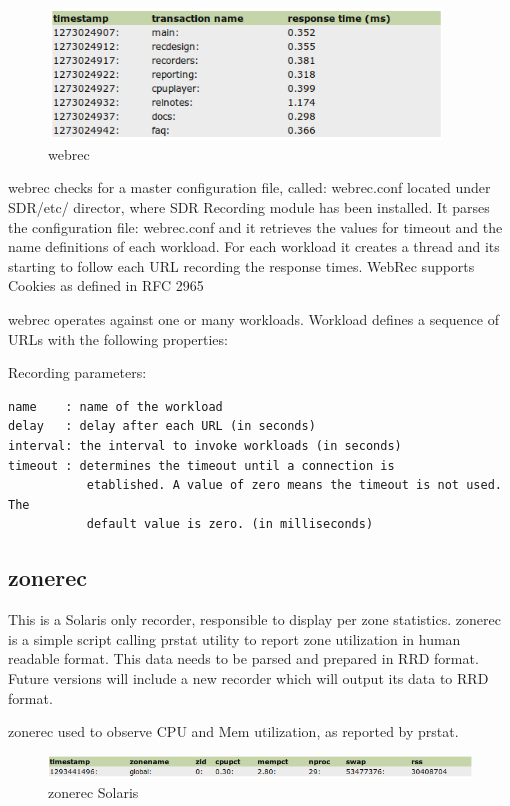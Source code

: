 \begin{figure}[!ht]
\centering
\includegraphics[width=105mm,height=35mm]{webrec.png}
\caption{webrec}
\label{fig:webrec}
\end{figure}

webrec checks for a master configuration file, called: webrec.conf located
under SDR/etc/ director, where SDR Recording module has been installed. It
parses the configuration file: webrec.conf and it retrieves the values for
timeout and the name definitions of each workload. For each workload it
creates a thread and its starting to follow each URL recording the response
times. WebRec supports Cookies as defined in RFC 2965 

webrec operates against one or many workloads. Workload defines a sequence of
URLs with the following properties:

\noindent
Recording parameters:

\begin{verbatim}
name    : name of the workload
delay   : delay after each URL (in seconds)
interval: the interval to invoke workloads (in seconds)
timeout : determines the timeout until a connection is
           etablished. A value of zero means the timeout is not used. The
           default value is zero. (in milliseconds)
\end{verbatim}



\subsection*{zonerec}
This is a Solaris only recorder, responsible to display per zone statistics. 
zonerec is a simple script calling prstat utility to report zone utilization in
human readable format. This data needs to be parsed and prepared in RRD
format. Future versions will include a new recorder which will output its data
to RRD format.

zonerec used to observe CPU and Mem utilization, as reported by prstat.



\begin{figure}[!ht]
\centering
\includegraphics[scale=0.62]{zonerec_sol.png}
\caption{zonerec Solaris}
\label{fig:zonerec_sol}
\end{figure}

